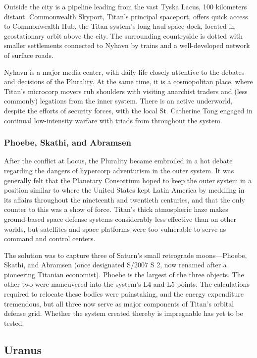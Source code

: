 Outside the city is a pipeline leading from the vast Tyska Lacus, 100 kilometers distant. Commonwealth Skyport, Titan's principal spaceport, offers quick access to Commonwealth Hub, the Titan system's long-haul space dock, located in geostationary orbit above the city. The surrounding countryside is dotted with smaller settlements connected to Nyhavn by trains and a well-developed network of surface roads. 

Nyhavn is a major media center, with daily life closely attentive to the debates and decisions of the Plurality. At the same time, it is a cosmopolitan place, where Titan's microcorp movers rub shoulders with visiting anarchist traders and (less commonly) legations from the inner system. There is an active underworld, despite the efforts of security forces, with the local St. Catherine Tong engaged in continual low-intensity warfare with triads from throughout the system. 

\subsubsection{Phoebe, Skathi, and Abramsen}
\label{sec:phoebe-skathi-abrams} 

After the conflict at Locus, the Plurality became embroiled in a hot debate regarding the dangers of hypercorp adventurism in the outer system. It was generally felt that the Planetary Consortium hoped to keep the outer system in a position similar to where the United States kept Latin America by meddling in its affairs throughout the nineteenth and twentieth centuries, and that the only counter to this was a show of force. Titan's thick atmospheric haze makes ground-based space defense systems considerably less effective than on other worlds, but satellites and space platforms were too vulnerable to serve as command and control centers. 

The solution was to capture three of Saturn's small retrograde moons—Phoebe, Skathi, and Abramsen (once designated S/2007 S 2, now renamed after a pioneering Titanian economist). Phoebe is the largest of the three objects. The other two were maneuvered into the system's L4 and L5 points. The calculations required to relocate these bodies were painstaking, and the energy expenditure tremendous, but all three now serve as major components of Titan's orbital defense grid. Whether the system created thereby is impregnable has yet to be tested. 

\subsection{Uranus}
\label{sec:uranus} 

